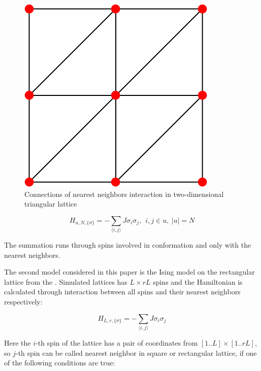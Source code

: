 \documentclass[aps,pre,amssymb,amsmath,twocolumn,floatfix]{revtex4-2}
\begin{document}
\begin{figure}[h!]
\begin{minipage}{0.45\columnwidth}
    \includegraphics[width=\textwidth]{Images/TriLattice.png}
    \caption{Connections of nearest neighbors interaction in two-dimensional triangular lattice}
    \label{fig:Is_A_J_Zoom}
\end{minipage}

\end{figure}

\begin{equation}\label{H_Ising_ISAW}
  H_{u, N, \{\sigma\}} = - \sum_{\langle i,j \rangle} J  \sigma_{i}  \sigma_{j},\ \ i,j \in u,\ |u| = N
\end{equation}

The summation runs through spins involved in conformation and only with the nearest neighbors. 

The second model considered in this paper is the Ising model on the rectangular lattice from the \cite{Selke2006}. Simulated lattices has $L \times rL$ spins and the Hamiltonian is calculated through interaction between all spins and their nearest neighbors respectively:

\begin{equation}\label{H_Ising_Rectan}
  H_{L, r, \{\sigma\}} = - \sum_{\langle i,j \rangle} J  \sigma_{i}  \sigma_{j}
\end{equation}

Here the $i$-th spin of the lattice has a pair of coordinates from $[1..L] \times [1..rL]$, so $j$-th spin can be called nearest neighbor in square or rectangular lattice, if one of the following conditions are true:
\end{document}
